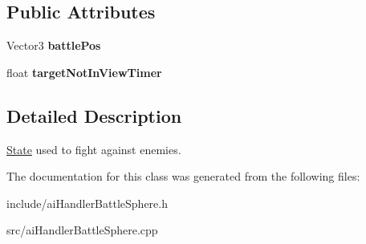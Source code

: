 \subsection*{\-Public \-Attributes}
\begin{DoxyCompactItemize}
\item 
\hypertarget{classAIStateBattleSphereCombat_adda87b83b7b6e5ad7a6b39ef745d70b7}{
\-Vector3 {\bfseries battle\-Pos}}
\label{d9/d37/classAIStateBattleSphereCombat_adda87b83b7b6e5ad7a6b39ef745d70b7}

\item 
\hypertarget{classAIStateBattleSphereCombat_a82ccbc31e67d47a6eaeccdaa0578c689}{
float {\bfseries target\-Not\-In\-View\-Timer}}
\label{d9/d37/classAIStateBattleSphereCombat_a82ccbc31e67d47a6eaeccdaa0578c689}

\end{DoxyCompactItemize}


\subsection{\-Detailed \-Description}
\hyperlink{classState}{\-State} used to fight against enemies. 

\-The documentation for this class was generated from the following files\-:\begin{DoxyCompactItemize}
\item 
include/ai\-Handler\-Battle\-Sphere.\-h\item 
src/ai\-Handler\-Battle\-Sphere.\-cpp\end{DoxyCompactItemize}
